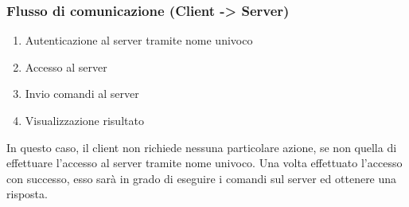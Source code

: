 \subsubsection{Flusso di comunicazione (Client -> Server)}
\begin{enumerate}
    \item Autenticazione al server tramite nome univoco
    \item Accesso al server
    \item Invio comandi al server
    \item Visualizzazione risultato
\end{enumerate}
In questo caso, il client non richiede nessuna particolare azione, se non quella di effettuare l'accesso al server tramite nome univoco. Una volta effettuato l'accesso con successo, esso sarà in grado di eseguire i comandi sul server ed ottenere una risposta.
